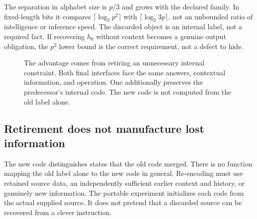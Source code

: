 \documentclass[11pt,letterpaper]{article}
\newcommand{\bits}[1]{\lceil\log_2 #1\rceil}
\theoremstyle{remark}\newtheorem{remark}{Remark}[section]
\begin{document}
The separation in alphabet size is $p/3$ and grows with the declared family. In fixed-length bits it compares $\bits{p^2}$ with $\bits{3p}$, not an unbounded ratio of intelligence or inference speed. The discarded object is an internal label, not a required fact. If recovering $h_0$ without context becomes a genuine output obligation, the $p^2$ lower bound is the correct requirement, not a defect to hide.

\begin{figure}[htbp]\centering
{}
\caption{The advantage comes from retiring an unnecessary internal constraint. Both final interfaces face the same answers, contextual information, and operation. One additionally preserves the predecessor's internal code. The new code is not computed from the old label alone.}\label{fig:retire}
\end{figure}

\subsection{Retirement does not manufacture lost information}
The new code distinguishes states that the old code merged. There is no function mapping the old label alone to the new code in general. Re-encoding must use retained source data, an independently sufficient earlier context and history, or genuinely new information. The portable experiment initializes each code from the actual supplied source. It does not pretend that a discarded source can be recovered from a clever instruction.
\end{document}
